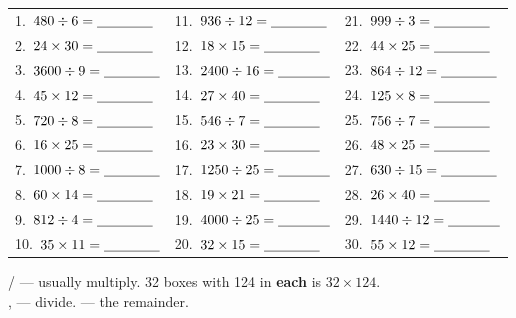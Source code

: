 \documentclass[12pt,a4paper]{article}
\begin{document}
\vspace{8pt}
\noindent
\begin{tabular}{@{}p{}p{}p{}@{}}
  1.\ $480 \div 6 = \blank[1.4cm]$   & 11.\ $936 \div 12 = \blank[1.4cm]$  & 21.\ $999 \div 3 = \blank[1.4cm]$ \\[12pt]
  2.\ $24 \times 30 = \blank[1.4cm]$ & 12.\ $18 \times 15 = \blank[1.4cm]$ & 22.\ $44 \times 25 = \blank[1.4cm]$ \\[12pt]
  3.\ $3600 \div 9 = \blank[1.4cm]$  & 13.\ $2400 \div 16 = \blank[1.3cm]$ & 23.\ $864 \div 12 = \blank[1.4cm]$ \\[12pt]
  4.\ $45 \times 12 = \blank[1.4cm]$ & 14.\ $27 \times 40 = \blank[1.4cm]$ & 24.\ $125 \times 8 = \blank[1.4cm]$ \\[12pt]
  5.\ $720 \div 8 = \blank[1.4cm]$   & 15.\ $546 \div 7 = \blank[1.4cm]$   & 25.\ $756 \div 7 = \blank[1.4cm]$ \\[12pt]
  6.\ $16 \times 25 = \blank[1.4cm]$ & 16.\ $23 \times 30 = \blank[1.4cm]$ & 26.\ $48 \times 25 = \blank[1.4cm]$ \\[12pt]
  7.\ $1000 \div 8 = \blank[1.4cm]$  & 17.\ $1250 \div 25 = \blank[1.3cm]$ & 27.\ $630 \div 15 = \blank[1.4cm]$ \\[12pt]
  8.\ $60 \times 14 = \blank[1.4cm]$ & 18.\ $19 \times 21 = \blank[1.4cm]$ & 28.\ $26 \times 40 = \blank[1.4cm]$ \\[12pt]
  9.\ $812 \div 4 = \blank[1.4cm]$   & 19.\ $4000 \div 25 = \blank[1.3cm]$ & 29.\ $1440 \div 12 = \blank[1.3cm]$ \\[12pt]
  10.\ $35 \times 11 = \blank[1.4cm]$ & 20.\ $32 \times 15 = \blank[1.4cm]$ & 30.\ $55 \times 12 = \blank[1.4cm]$ \\
\end{tabular}


\begin{wordhelp}
   /  --- usually multiply. 32 boxes with 124 in \textbf{each} is
  $32 \times 124$. \\
   \sep {} --- divide.
  \quad {} --- the remainder.
\end{wordhelp}
\end{document}
